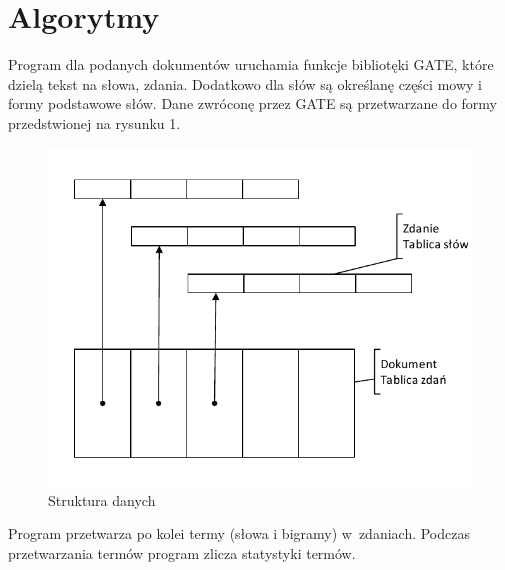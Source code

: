 \documentclass[11pt]{article}
\begin{document}
\section{Algorytmy}
Program dla podanych dokumentów uruchamia funkcje bibliotęki GATE, które dzielą tekst na słowa, zdania. Dodatkowo dla słów są określanę części mowy i formy podstawowe słów.
Dane zwróconę przez GATE są przetwarzane do formy przedstwionej na rysunku 1.
\begin{figure}
  \begin{center}
    \includegraphics{Struktura danych.pdf}
    \caption{Struktura danych}
  \end{center}
\end{figure}
Program przetwarza po kolei termy (słowa i bigramy) w~zdaniach. Podczas przetwarzania termów program zlicza statystyki termów.
 
\end{document}
